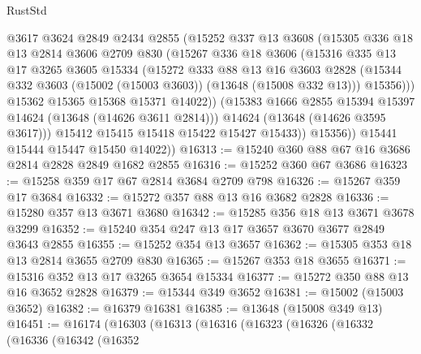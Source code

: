 \begin{lexlean}{RustStd}
\begin{coremodule}
                  @3617
                  @3624
                  @2849
                  @2434
                  @2855
                  (@15252
                    @337
                    @13
                    @3608
                    (@15305
                      @336
                      @18
                      @13
                      @2814
                      @3606
                      @2709
                      @830
                      (@15267
                        @336
                        @18
                        @3606
                        (@15316
                          @335
                          @13
                          @17
                          @3265
                          @3605
                          @15334
                          (@15272
                            @333
                            @88
                            @13
                            @16
                            @3603
                            @2828
                            (@15344 @332 @3603 (@15002 (@15003 @3603)) (@13648 (@15008 @332 @13)))
                            @15356)))
                      @15362
                      @15365
                      @15368
                      @15371
                      @14022))
                  (@15383 @1666 @2855 @15394 @15397 @14624 (@13648 (@14626 @3611 @2814)))
                  @14624
                  (@13648 (@14626 @3595 @3617)))
                @15412
                @15415
                @15418
                @15422
                @15427
                @15433))
            @15356))
        @15441
        @15444
        @15447
        @15450
        @14022))
@16313 := @15240 @360 @88 @67 @16 @3686 @2814 @2828 @2849 @1682 @2855
@16316 := @15252 @360 @67 @3686
@16323 := @15258 @359 @17 @67 @2814 @3684 @2709 @798
@16326 := @15267 @359 @17 @3684
@16332 := @15272 @357 @88 @13 @16 @3682 @2828
@16336 := @15280 @357 @13 @3671 @3680
@16342 := @15285 @356 @18 @13 @3671 @3678 @3299
@16352 := @15240 @354 @247 @13 @17 @3657 @3670 @3677 @2849 @3643 @2855
@16355 := @15252 @354 @13 @3657
@16362 := @15305 @353 @18 @13 @2814 @3655 @2709 @830
@16365 := @15267 @353 @18 @3655
@16371 := @15316 @352 @13 @17 @3265 @3654 @15334
@16377 := @15272 @350 @88 @13 @16 @3652 @2828
@16379 := @15344 @349 @3652
@16381 := @15002 (@15003 @3652)
@16382 := @16379 @16381
@16385 := @13648 (@15008 @349 @13)
@16451 := @16174
    (@16303
      (@16313
        (@16316
          (@16323
            (@16326
              (@16332
                (@16336
                  (@16342
                    (@16352

\end{coremodule}
\end{lexlean}

